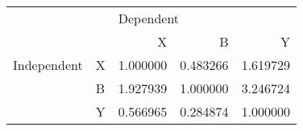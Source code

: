 \begin{tabular}{llrrr}
\toprule
            &   & \multicolumn{3}{l}{Dependent} \\
            &   &         X &         B &         Y \\
\midrule
Independent & X &  1.000000 &  0.483266 &  1.619729 \\
            & B &  1.927939 &  1.000000 &  3.246724 \\
            & Y &  0.566965 &  0.284874 &  1.000000 \\
\bottomrule
\end{tabular}
